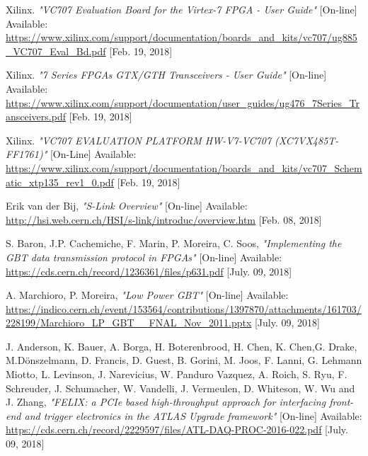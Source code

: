 \begin{thebibliography}{9}
	Xilinx.
	\textit{"VC707 Evaluation Board for the Virtex-7 FPGA - User Guide"}
	[On-line] Available:
	\url{https://www.xilinx.com/support/documentation/boards_and_kits/vc707/ug885_VC707_Eval_Bd.pdf} [Feb. 19, 2018]
	
	Xilinx.
	\textit{"7 Series FPGAs GTX/GTH Transceivers - User Guide"}
	[On-line] Available:
	\url{https://www.xilinx.com/support/documentation/user_guides/ug476_7Series_Transceivers.pdf} [Feb. 19, 2018]
	
	Xilinx.
	\textit{"VC707 EVALUATION PLATFORM HW-V7-VC707 (XC7VX485T-FF1761)"}
	[On-Line] Available:
	\url{https://www.xilinx.com/support/documentation/boards_and_kits/vc707_Schematic_xtp135_rev1_0.pdf} [Feb. 19, 2018]

	Erik van der Bij,
	\textit{"S-Link Overview"}
	[On-line] Available:
	\url{http://hsi.web.cern.ch/HSI/s-link/introduc/overview.htm} [Feb. 08, 2018]

	S. Baron, J.P. Cachemiche, F. Marin, P. Moreira, C. Soos,
	\textit{"Implementing the GBT data transmission protocol in FPGAs"}
	[On-line] Available:
	\url{https://cds.cern.ch/record/1236361/files/p631.pdf} [July. 09, 2018]
	
	A. Marchioro, P. Moreira,
	\textit{"Low Power GBT"}
	[On-line] Available:
	\url{https://indico.cern.ch/event/153564/contributions/1397870/attachments/161703/228199/Marchioro_LP_GBT__FNAL_Nov_2011.pptx} [July. 09, 2018]
	
	J. Anderson, K. Bauer, A. Borga, H. Boterenbrood, H. Chen, K. Chen,G. Drake, M.Dönszelmann, D. Francis, D. Guest, B. Gorini, M. Joos, F. Lanni, G. Lehmann Miotto, L. Levinson, J. Narevicius, W. Panduro Vazquez, A. Roich, S. Ryu, F. Schreuder, J. Schumacher, W. Vandelli, J. Vermeulen, D. Whiteson, W. Wu and J. Zhang,
	\textit{"FELIX: a PCIe based high-throughput approach for interfacing front-end and trigger electronics in the ATLAS Upgrade framework"}
	[On-line] Available:
	\url{https://cds.cern.ch/record/2229597/files/ATL-DAQ-PROC-2016-022.pdf} [July. 09, 2018]

\end{thebibliography}
\newpage